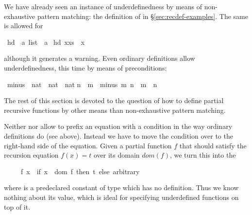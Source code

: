 \begin{isabellebody}
\begin{isamarkuptext}
We have already seen an instance of underdefinedness by means of
non-exhaustive pattern matching: the definition of  in
\S\ref{sec:recdef-examples}. The same is allowed for %
\end{isamarkuptext}%
\isamarkuptrue%
\ hd\ {\isacharcolon}{\isacharcolon}\ {\isachardoublequote}{\isacharprime}a\ list\ {\isasymRightarrow}\ {\isacharprime}a{\isachardoublequote}\isanewline
\isamarkupfalse%
\ {\isachardoublequote}hd\ {\isacharparenleft}x{\isacharhash}xs{\isacharparenright}\ {\isacharequal}\ x{\isachardoublequote}\isamarkupfalse%
%
\begin{isamarkuptext}%
\noindent
although it generates a warning.
Even ordinary definitions allow underdefinedness, this time by means of
preconditions:%
\end{isamarkuptext}%
\isamarkuptrue%
\ minus\ {\isacharcolon}{\isacharcolon}\ {\isachardoublequote}nat\ {\isasymRightarrow}\ nat\ {\isasymRightarrow}\ nat{\isachardoublequote}\isanewline
{\isachardoublequote}n\ {\isasymle}\ m\ {\isasymLongrightarrow}\ minus\ m\ n\ {\isasymequiv}\ m\ {\isacharminus}\ n{\isachardoublequote}\isamarkupfalse%
%
\begin{isamarkuptext}%
The rest of this section is devoted to the question of how to define
partial recursive functions by other means than non-exhaustive pattern
matching.%
\end{isamarkuptext}%
\isamarkuptrue%
%
\isamarkuptrue%
%
\begin{isamarkuptext}%
%
Neither  nor  allow to
prefix an equation with a condition in the way ordinary definitions do
(see  above). Instead we have to move the condition over
to the right-hand side of the equation. Given a partial function $f$
that should satisfy the recursion equation $f(x) = t$ over its domain
$dom(f)$, we turn this into the 
\begin{isabelle}%
\ \ \ \ \ f\ x\ {\isacharequal}\ {\isacharparenleft}if\ x\ {\isasymin}\ dom\ f\ then\ t\ else\ arbitrary{\isacharparenright}%
\end{isabelle}
where  is a predeclared constant of type 
which has no definition. Thus we know nothing about its value,
which is ideal for specifying underdefined functions on top of it.


\end{isamarkuptext}
\end{isabellebody}
